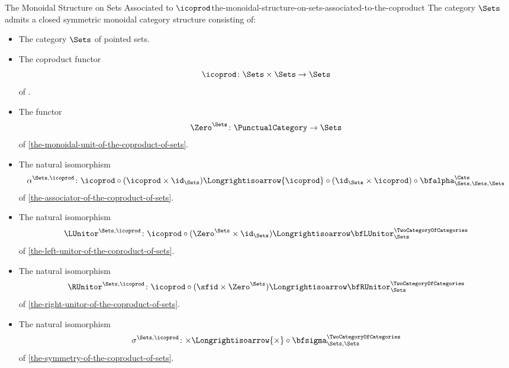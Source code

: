 \begin{proposition}{The Monoidal Structure on Sets Associated to $\icoprod$}{the-monoidal-structure-on-sets-associated-to-the-coproduct}%
    The category $\Sets$ admits a closed symmetric monoidal category structure consisting of:%
    \begin{itemize}
        \item{}The category $\Sets$ of pointed sets.
        \item{}The coproduct functor
            \[
                \icoprod%
                \colon%
                \Sets\times\Sets%
                \to%
                \Sets
            \]%
            of .
        \item{}The functor
            \[
                \Zero^{\Sets}
                \colon
                \PunctualCategory
                \to
                \Sets
            \]
            of \cref{the-monoidal-unit-of-the-coproduct-of-sets}.
        \item{}The natural isomorphism
            \[
                \alpha^{\Sets,\icoprod}
                \colon
                {\icoprod}\circ{({\icoprod}\times\id_{\Sets})}
                \Longrightisoarrow
                {\icoprod}\circ{(\id_{\Sets}\times{\icoprod})}\circ{\bfalpha^{\Cats}_{\Sets,\Sets,\Sets}}
            \]
            of \cref{the-associator-of-the-coproduct-of-sets}.
        \item{}The natural isomorphism
            \[
                \LUnitor^{\Sets,\icoprod}%
                \colon%
                {\icoprod}\circ{(\Zero^{\Sets}\times\id_{\Sets})}
                \Longrightisoarrow
                \bfLUnitor^{\TwoCategoryOfCategories}_{\Sets}
            \]
            of \cref{the-left-unitor-of-the-coproduct-of-sets}.
        \item{}The natural isomorphism
            \[
                \RUnitor^{\Sets,\icoprod}%
                \colon%
                {\icoprod}\circ{({\sfid}\times{\Zero^{\Sets}})}%
                \Longrightisoarrow%
                \bfRUnitor^{\TwoCategoryOfCategories}_{\Sets}%
            \]
            of \cref{the-right-unitor-of-the-coproduct-of-sets}.
        \item{}The natural isomorphism
            \[
                \sigma^{\Sets,\icoprod}
                \colon
                {\times}
                \Longrightisoarrow
                {\times}\circ{\bfsigma^{\TwoCategoryOfCategories}_{\Sets,\Sets}}
            \]
            of \cref{the-symmetry-of-the-coproduct-of-sets}.
    \end{itemize}
\end{proposition}
